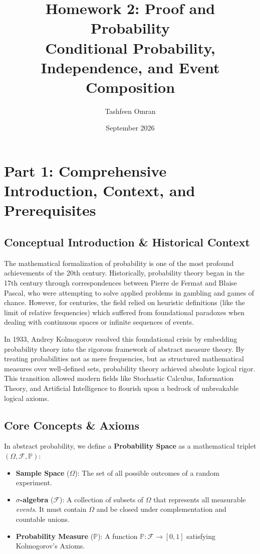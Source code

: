 \documentclass[12pt]{article}
\title{\textbf{Homework 2: Proof and Probability \\ \large Conditional Probability, Independence, and Event Composition}}
\author{Tashfeen Omran}
\date{September 2026}
\theoremstyle{definition}
\theoremstyle{remark}
\begin{document}
\maketitle
\tableofcontents
\newpage

\section{Part 1: Comprehensive Introduction, Context, and Prerequisites}

\subsection{Conceptual Introduction \& Historical Context}
The mathematical formalization of probability is one of the most profound achievements of the 20th century. Historically, probability theory began in the 17th century through correspondences between Pierre de Fermat and Blaise Pascal, who were attempting to solve applied problems in gambling and games of chance. However, for centuries, the field relied on heuristic definitions (like the limit of relative frequencies) which suffered from foundational paradoxes when dealing with continuous spaces or infinite sequences of events.

In 1933, Andrey Kolmogorov resolved this foundational crisis by embedding probability theory into the rigorous framework of abstract measure theory. By treating probabilities not as mere frequencies, but as structured mathematical measures over well-defined sets, probability theory achieved absolute logical rigor. This transition allowed modern fields like Stochastic Calculus, Information Theory, and Artificial Intelligence to flourish upon a bedrock of unbreakable logical axioms.

\subsection{Core Concepts \& Axioms}
In abstract probability, we define a \textbf{Probability Space} as a mathematical triplet $(\Omega, \mathcal{F}, \mathbb{P})$:
\begin{itemize}
    \item \textbf{Sample Space} ($\Omega$): The set of all possible outcomes of a random experiment.
    \item \textbf{$\sigma$-algebra} ($\mathcal{F}$): A collection of subsets of $\Omega$ that represents all measurable \textit{events}. It must contain $\Omega$ and be closed under complementation and countable unions.
    \item \textbf{Probability Measure} ($\mathbb{P}$): A function $\mathbb{P}: \mathcal{F} \to [0, 1]$ satisfying Kolmogorov's Axioms.
\end{itemize}
\end{document}
